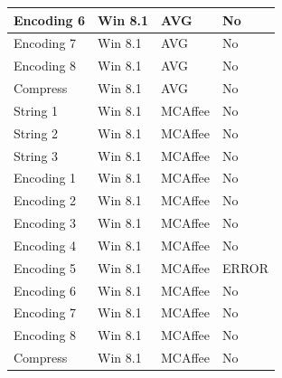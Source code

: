 \documentclass{article}%
\begin{document}
\begin{table}[]
\begin{center}
\begin{tabular}{|l|l|l|l|}
Encoding 6  & Win 8.1 & AVG              & No       \\ \hline
Encoding 7  & Win 8.1 & AVG              & No       \\ \hline
Encoding 8  & Win 8.1 & AVG              & No       \\ \hline
Compress    & Win 8.1 & AVG              & No       \\ \hline
String 1    & Win 8.1 & MCAffee          & No       \\ \hline
String 2    & Win 8.1 & MCAffee          & No       \\ \hline
String 3    & Win 8.1 & MCAffee          & No       \\ \hline
Encoding 1  & Win 8.1 & MCAffee          & No       \\ \hline
Encoding 2  & Win 8.1 & MCAffee          & No       \\ \hline
Encoding 3  & Win 8.1 & MCAffee          & No       \\ \hline
Encoding 4  & Win 8.1 & MCAffee          & No       \\ \hline
Encoding 5  & Win 8.1 & MCAffee          & ERROR    \\ \hline
Encoding 6  & Win 8.1 & MCAffee          & No       \\ \hline
Encoding 7  & Win 8.1 & MCAffee          & No       \\ \hline
Encoding 8  & Win 8.1 & MCAffee          & No       \\ \hline
Compress    & Win 8.1 & MCAffee          & No       \\ \hline
\end{tabular}
\end{center}
\end{table}
\end{document}
